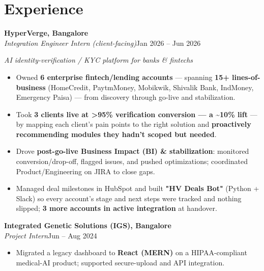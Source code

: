 \documentclass[10pt,a4paper]{article}
\begin{document}
\section*{Experience}
\vspace{1pt}\textbf{HyperVerge, Bangalore}\\
\textit{Integration Engineer Intern (client-facing)}\hfill Jan 2026 -- Jun 2026\par\vspace{1pt}
{\small\itshape AI identity-verification / KYC platform for banks \& fintechs}\par\vspace{1pt}
\begin{itemize}
\item Owned \textbf{6 enterprise fintech/lending accounts} --- spanning \textbf{15+ lines-of-business} (HomeCredit, PaytmMoney, Mobikwik, Shivalik Bank, IndMoney, Emergency Paisa) --- from discovery through go-live and stabilization.
\item Took \textbf{3 clients live at \textgreater{}95\% verification conversion --- a \textasciitilde{}10\% lift} --- by mapping each client's pain points to the right solution and \textbf{proactively recommending modules they hadn't scoped but needed}.
\item Drove \textbf{post-go-live Business Impact (BI) \& stabilization}: monitored conversion/drop-off, flagged issues, and pushed optimizations; coordinated Product/Engineering on JIRA to close gaps.
\item Managed deal milestones in HubSpot and built \textbf{"HV Deals Bot"} (Python + Slack) so every account's stage and next steps were tracked and nothing slipped; \textbf{3 more accounts in active integration} at handover.
\end{itemize}
\vspace{1pt}\textbf{Integrated Genetic Solutions (IGS), Bangalore}\\
\textit{Project Intern}\hfill Jun -- Aug 2024\par\vspace{1pt}
\begin{itemize}
\item Migrated a legacy dashboard to \textbf{React (MERN)} on a HIPAA-compliant medical-AI product; supported secure-upload and API integration.
\end{itemize}
\end{document}
